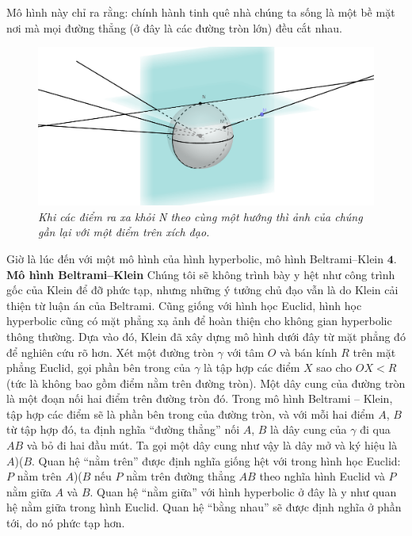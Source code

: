 \begin{multicols}{2}
	\vskip 0.1cm
	Mô hình này chỉ ra rằng: chính hành tinh quê nhà chúng ta sống là một bề mặt nơi mà mọi đường thẳng (ở đây là các đường tròn lớn) đều cắt nhau.
	\begin{figure}[H]
		\vspace*{-5pt}
		\centering
		\captionsetup{labelformat= empty, justification=centering}
		\includegraphics[width= 1\linewidth]{Stereographic_projection.png}
		\caption{\small\textit{\color{lichsutoanhoc}Khi các điểm ra xa khỏi N theo cùng một hướng thì ảnh của chúng gần lại với một điểm trên xích đạo.}}
		\vspace*{-10pt}
	\end{figure}
	Giờ là lúc đến với một mô hình của hình hyperbolic, mô hình Beltrami--Klein
	\vskip 0.1cm
	$\pmb{4.}$ \textbf{\color{lichsutoanhoc}Mô hình Beltrami--Klein}
	\vskip 0.1cm
	Chúng tôi sẽ không trình bày y hệt như công trình gốc của Klein để đỡ phức tạp, nhưng những ý tưởng chủ đạo vẫn là do Klein cải thiện từ luận án của Beltrami.
	Cũng giống với hình học Euclid, hình học hyperbolic cũng có mặt phẳng xạ ảnh để hoàn thiện cho không gian hyperbolic thông thường. Dựa vào đó, Klein đã xây dựng mô hình dưới đây từ mặt phẳng đó để nghiên cứu rõ hơn.
	Xét một đường tròn $\gamma$ với tâm $O$ và bán kính $R$ trên mặt phẳng Euclid, gọi phần bên trong của $ \gamma$ là tập hợp các điểm $X$ sao cho $OX < R$ (tức là không bao gồm điểm nằm trên đường tròn). Một dây cung của đường tròn là một đoạn nối hai điểm trên đường tròn đó.
	Trong mô hình Beltrami -- Klein, tập hợp các điểm sẽ là phần bên trong của đường tròn, và với mỗi hai điểm $A$, $B$ từ tập hợp đó, ta định nghĩa ``đường thẳng'' nối $A$, $B$ là dây cung của $ \gamma$ đi qua $AB$ và bỏ đi hai đầu mút. Ta gọi một dây cung như vậy là dây mở và ký hiệu là $A$)($B$. Quan hệ ``nằm trên'' được định nghĩa giống hệt với trong hình học Euclid: $P$ nằm trên $A$)($B$ nếu $P$ nằm trên đường thẳng $AB$ theo nghĩa hình Euclid và $P$ nằm giữa $A$ và $B$. Quan hệ ``nằm giữa'' với hình hyperbolic ở đây là y như quan hệ nằm giữa trong hình Euclid. Quan hệ ``bằng nhau'' sẽ được định nghĩa ở phần tới, do nó phức tạp hơn.

\end{multicols}
